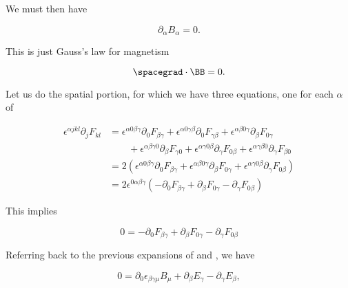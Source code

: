 We must then have

\begin{equation}\label{eqn:relativisticElectrodynamicsL11:830}
\partial_\alpha B_\alpha = 0.
\end{equation}

This is just Gauss's law for magnetism

\begin{equation}\label{eqn:relativisticElectrodynamicsL11:850}
\spacegrad \cdot \BB = 0.
\end{equation}

Let us do the spatial portion, for which we have three equations, one for each $\alpha$ of

\begin{equation}\label{eqn:relativisticElectrodynamicsL11b:1420}
\begin{aligned}
\epsilon^{\alpha j k l} \partial_j F_{k l}
&=
\epsilon^{\alpha 0 \beta \gamma} \partial_0 F_{\beta \gamma}
+\epsilon^{\alpha 0 \gamma \beta} \partial_0 F_{\gamma \beta}
+\epsilon^{\alpha \beta 0 \gamma} \partial_\beta F_{0 \gamma} \\
&\qquad +\epsilon^{\alpha \beta \gamma 0} \partial_\beta F_{\gamma 0}
+\epsilon^{\alpha \gamma 0 \beta} \partial_\gamma F_{0 \beta}
+\epsilon^{\alpha \gamma \beta 0} \partial_\gamma F_{\beta 0} \\
&=
2 \left( 
\epsilon^{\alpha 0 \beta \gamma} \partial_0 F_{\beta \gamma}
+\epsilon^{\alpha \beta 0 \gamma} \partial_\beta F_{0 \gamma}
+\epsilon^{\alpha \gamma 0 \beta} \partial_\gamma F_{0 \beta}
\right) \\
&=
2 \epsilon^{0 \alpha \beta \gamma} \left(
-\partial_0 F_{\beta \gamma}
+\partial_\beta F_{0 \gamma}
- \partial_\gamma F_{0 \beta}
\right)
\end{aligned}
\end{equation}

This implies

\begin{equation}\label{eqn:relativisticElectrodynamicsL11:1320}
0 =
-\partial_0 F_{\beta \gamma}
+\partial_\beta F_{0 \gamma}
- \partial_\gamma F_{0 \beta}
\end{equation}

Referring back to the previous expansions of  and , we have

\begin{equation}\label{eqn:relativisticElectrodynamicsL11:1340}
0 =
\partial_0 \epsilon_{\beta\gamma\mu} B_\mu
+\partial_\beta E_\gamma
- \partial_\gamma E_{\beta},
\end{equation}

